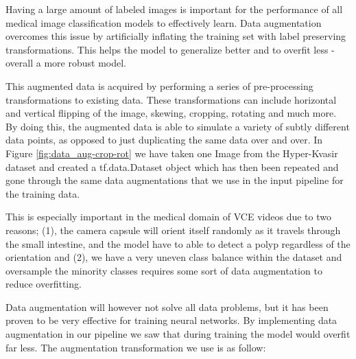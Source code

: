 \documentclass[thesis.tex]{subfiles}
\begin{document}
Having a large amount of labeled images is important for the performance of all medical image classification models to effectively learn. Data augmentation overcomes this issue by artificially inflating the training set with label preserving transformations. This helps the model to generalize better and to overfit less - overall a more robust model.

This augmented data is acquired by performing a series of pre-processing transformations to existing data. These transformations can include horizontal and vertical flipping of the image, skewing, cropping, rotating and much more. By doing this, the augmented data is able to simulate a variety of subtly different data points, as opposed to just duplicating the same data over and over. In Figure \ref{fig:data_aug-crop-rot} we have taken one Image from the Hyper-Kvasir dataset and created a tf.data.Dataset object which has then been repeated and gone through the same data augmentations that we use in the input pipeline for the training data.

This is especially important in the medical domain of VCE videos due to two reasons; (1), the camera capsule will orient itself randomly as it travels through the small intestine, and the model have to able to detect a polyp regardless of the orientation and (2), we have a very uneven class balance within the dataset and oversample the minority classes requires some sort of data augmentation to reduce overfitting.

Data augmentation will however not solve all data problems, but it has been proven to be very effective for training neural networks. By implementing data augmentation in our pipeline we saw that during training the model would overfit far less. The augmentation transformation we use is as follow:
\end{document}
